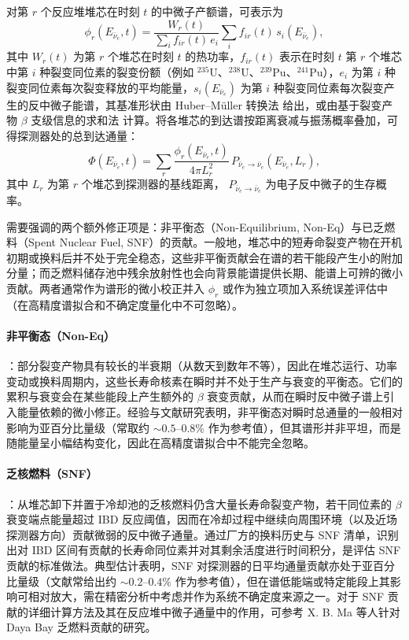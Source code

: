 对第 $r$ 个反应堆堆芯在时刻 $t$ 的中微子产额谱，可表示为
\begin{equation}
\phi_r(E_{\bar{\nu}_e},t)
= \frac{W_r(t)}{\sum_i f_{ir}(t)\,e_i}\sum_i f_{ir}(t)\,s_i(E_{\bar{\nu}_e}),
\label{eq:phi-r-reactor-spectrum}
\end{equation}
其中 $W_r(t)$ 为第 $r$ 个堆芯在时刻 $t$ 的热功率，$f_{ir}(t)$ 表示在时刻 $t$ 第 $r$ 个堆芯中第 $i$ 种裂变同位素的裂变份额（例如 $^{235}\mathrm{U}$、$^{238}\mathrm{U}$、$^{239}\mathrm{Pu}$、$^{241}\mathrm{Pu}$），$e_i$ 为第 $i$ 种裂变同位素每次裂变释放的平均能量，$s_i(E_{\bar{\nu}_e})$ 为第 $i$ 种裂变同位素每次裂变产生的反中微子能谱，其基准形状由 Huber--Müller 转换法\cite{Huber2011Reactor,Mueller2011Improved} 给出，或由基于裂变产物 $\beta$ 支级信息的求和法\cite{Fallot2012_Summation,Estienne2019Summation} 计算。将各堆芯的到达谱按距离衰减与振荡概率叠加，可得探测器处的总到达通量：
\begin{equation}
\Phi(E_{\bar{\nu}_e},t)=\sum_r \frac{\phi_r(E_{\bar{\nu}_e},t)}{4\pi L_r^2}\,P_{\bar{\nu}_e\to\bar{\nu}_e}(E_{\bar{\nu}_e},L_r),
\label{eq:Phi-total-reactor-flux}
\end{equation}
其中 $L_r$ 为第 $r$ 个堆芯到探测器的基线距离， $P_{\bar{\nu}_e\to\bar{\nu}_e}$ 为电子反中微子的生存概率。

需要强调的两个额外修正项是：非平衡态（Non-Equilibrium, Non-Eq）与已乏燃料（Spent Nuclear Fuel, SNF）的贡献。一般地，堆芯中的短寿命裂变产物在开机初期或换料后并不处于完全稳态，这些非平衡贡献会在谱的若干能段产生小的附加分量；而乏燃料储存池中残余放射性也会向背景能谱提供长期、能谱上可辨的微小贡献。两者通常作为谱形的微小校正并入 $\phi_r$ 或作为独立项加入系统误差评估中（在高精度谱拟合和不确定度量化中不可忽略）。

\paragraph*{非平衡态（Non-Eq）}：部分裂变产物具有较长的半衰期（从数天到数年不等），因此在堆芯运行、功率变动或换料周期内，这些长寿命核素在瞬时并不处于生产与衰变的平衡态。它们的累积与衰变会在某些能段上产生额外的 $\beta$ 衰变贡献，从而在瞬时反中微子谱上引入能量依赖的微小修正。经验与文献研究表明，非平衡态对瞬时总通量的一般相对影响为亚百分比量级（常取约 $\sim 0.5$--$0.8\%$ 作为参考值）\citep{Huber2011_nonEq,PhysRevLett.134.201802}，但其谱形并非平坦，而是随能量呈小幅结构变化，因此在高精度谱拟合中不能完全忽略。

\paragraph*{乏核燃料（SNF）}：从堆芯卸下并置于冷却池的乏核燃料仍含大量长寿命裂变产物，若干同位素的 $\beta$ 衰变端点能量超过 IBD 反应阈值，因而在冷却过程中继续向周围环境（以及近场探测器方向）贡献微弱的反中微子通量。通过厂方的换料历史与 SNF 清单，识别出对 IBD 区间有贡献的长寿命同位素并对其剩余活度进行时间积分，是评估 SNF 贡献的标准做法。典型估计表明，SNF 对探测器的日平均通量贡献亦处于亚百分比量级（文献常给出约 $\sim 0.2$--$0.4\%$ 作为参考值）\citep{Ma2015_SNF,PhysRevLett.134.201802}，但在谱低能端或特定能段上其影响可相对放大，需在精密分析中考虑并作为系统不确定度来源之一。对于 SNF 贡献的详细计算方法及其在反应堆中微子通量中的作用，可参考 X. B. Ma 等人针对 Daya Bay 乏燃料贡献的研究\citep{Ma2015_SNF}。

